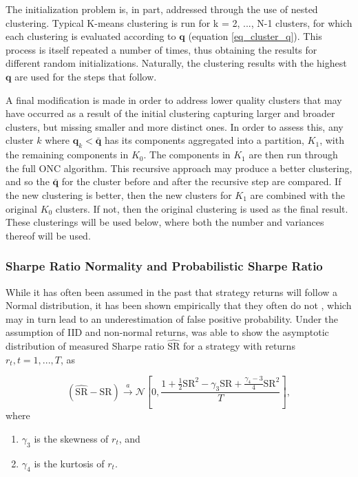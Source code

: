 \documentclass[a4paper,11pt,oneside]{article}
\theoremstyle{plain}
\theoremstyle{definition}
\begin{document}
	The initialization problem is, in part, addressed through the use of nested clustering. Typical K-means clustering is run for k = 2, ..., N-1 clusters, for which each clustering is evaluated according to $\mathbf{q}$ (equation \eqref{eq_cluster_q}). This process is itself repeated a number of times, thus obtaining the results for different random initializations. Naturally, the clustering results with the highest $\mathbf{q}$ are used for the steps that follow. \newline
	
	A final modification is made in order to address lower quality clusters that may have occurred as a result of the initial clustering capturing larger and broader clusters, but missing smaller and more distinct ones. In order to assess this, any cluster $k$ where $\mathbf{q}_k < \mathbf{\bar{q}}$ has its components aggregated into a partition, $K_1$, with the remaining components in $K_0$. The components in $K_1$ are then run through the full ONC algorithm. This recursive approach may produce a better clustering, and so the  $\mathbf{\bar{q}}$  for the cluster before and after the recursive step are compared. If the new clustering is better, then the new clusters for $K_1$ are combined with the original $K_0$ clusters. If not, then the original clustering is used as the final result. These clusterings will be used below, where both the number and variances thereof will be used.
	
	\subsubsection{Sharpe Ratio Normality and Probabilistic Sharpe Ratio}\label{sr_normality}
	
	While it has often been assumed in the past that strategy returns will follow a Normal distribution, it has been shown empirically that they often do not \citep{Brooks}, which may in turn lead to an underestimation of false positive probability. Under the assumption of IID and non-normal returns, \citet{Mertens} was able to show the asymptotic distribution of measured Sharpe ratio $\widehat{\mathrm{SR}}$ for a strategy with returns $r_t , t = 1, ..., T$,  as 
	
	\begin{equation}
	(\widehat{\mathrm{SR}}-\mathrm{SR}) \stackrel{a}{\rightarrow} \mathcal{N}\left[0, \frac{1+\frac{1}{2} \mathrm{SR}^{2}-\gamma_{3} \mathrm{SR}+\frac{\gamma_{4}-3}{4}\mathrm{SR}^{2}}{T}\right],
	\end{equation}
	where
	\begin{enumerate}
		\item $\gamma_3$ is the skewness of $r_t$, and 
		\item $\gamma_4$ is the kurtosis of $r_t$.
	\end{enumerate}
\end{document}
